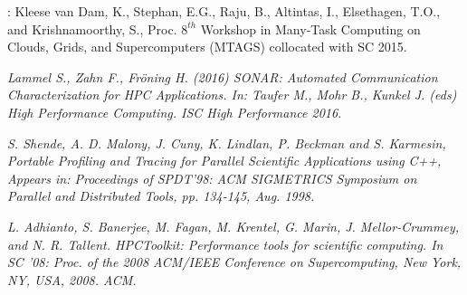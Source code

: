 \documentclass[11pt]{article}
\begin{document}
%
%
\begin{thebibliography}{1}

  :
  {Kleese van Dam, K., Stephan, E.G., Raju, B., Altintas, I., Elsethagen, T.O., and Krishnamoorthy, S.}, {Proc. $8^{th}$ Workshop in Many-Task Computing on Clouds, Grids, and Supercomputers (MTAGS) collocated with SC 2015}.
  
  
   {\em Lammel S., Zahn F., Fröning H. (2016) SONAR: Automated Communication Characterization for HPC Applications. In: Taufer M., Mohr B., Kunkel J. (eds) High Performance Computing. ISC High Performance 2016.}
  
  {\em S. Shende, A. D. Malony, J. Cuny, K. Lindlan, P. Beckman and S. Karmesin, Portable Profiling and Tracing for Parallel Scientific Applications using C++, Appears in: Proceedings of SPDT'98: ACM SIGMETRICS Symposium on Parallel and Distributed Tools, pp. 134-145, Aug. 1998.}
 
 
  {\em L. Adhianto, S. Banerjee, M. Fagan, M. Krentel, G. Marin, J. Mellor-Crummey, and N. R. Tallent. HPCToolkit: Performance tools for scientific computing. In SC '08: Proc. of the 2008 ACM/IEEE Conference on Supercomputing, New York, NY, USA, 2008. ACM.}
 
\end{thebibliography}
\end{document}

